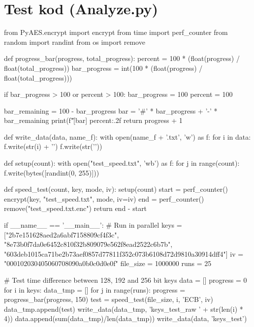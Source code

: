 \chapter{Test kod (Analyze.py)}
\label{app:analyze}

\begin{python}
from PyAES.encrypt import encrypt
from time import perf_counter
from random import randint
from os import remove


def progress_bar(progress, total_progress):
    percent = 100 * (float(progress) / float(total_progress))
    bar_progress = int(100 * (float(progress) / float(total_progress)))

    if bar_progress > 100 or percent > 100:
        bar_progress = 100
        percent = 100

    bar_remaining = 100 - bar_progress
    bar = '#' * bar_progress + '-' * bar_remaining
    print(f"\r[{bar}] {percent:.2f}%
    return progress + 1


def write_data(data, name_f):
    with open(name_f + '.txt', 'w') as f:
        for i in data:
            f.write(str(i) + '\n')
        f.write(str('\n'))


def setup(count):
        with open("test_speed.txt", 'wb') as f:
            for j in range(count):
                f.write(bytes([randint(0, 255)]))


def speed_test(count, key, mode, iv):
    setup(count)
    start = perf_counter()
    encrypt(key, "test_speed.txt", mode, iv=iv)
    end = perf_counter()
    remove("test_speed.txt.enc")
    return end - start


if __name__ == '__main__':
    # Run in parallel
    keys = ["2b7e151628aed2a6abf7158809cf4f3c",
            "8e73b0f7da0e6452c810f32b809079e562f8ead2522c6b7b",
            "603deb1015ca71be2b73aef0857d77811f352c073b6108d72d9810a30914dff4"]
    iv = "000102030405060708090a0b0c0d0e0f"
    file_size = 1000000
    runs = 25

    # Test time difference between 128, 192 and 256 bit keys
    data = []
    progress = 0
    for i in keys:
        data_tmp = []
        for j in range(runs):
            progress = progress_bar(progress, 150)
            test = speed_test(file_size, i, 'ECB', iv)
            data_tmp.append(test)
        write_data(data_tmp, 'keys_test_raw ' + str(len(i) * 4))
        data.append(sum(data_tmp)/len(data_tmp))
    write_data(data, 'keys_test')


\end{python}
